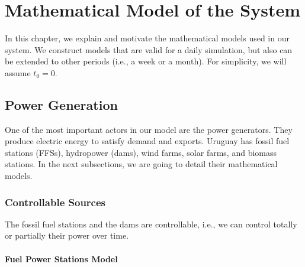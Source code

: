\chapter{Mathematical Model of the System} \label{Chapter_3}

In this chapter, we explain and motivate the mathematical models used in our system. We construct models that are valid for a daily simulation, but also can be extended to other periods (i.e., a week or a month). For simplicity, we will assume $t_0=0$.

\section{Power Generation}

One of the most important actors in our model are the power generators. They produce electric energy to satisfy demand and exports. Uruguay has fossil fuel stations (FFSs), hydropower (dams), wind farms, solar farms, and biomass stations. In the next subsections, we are going to detail their mathematical models.

\subsection{Controllable Sources}

The fossil fuel stations and the dams are controllable, i.e., we can control totally or partially their power over time.

\subsubsection{Fuel Power Stations Model}

